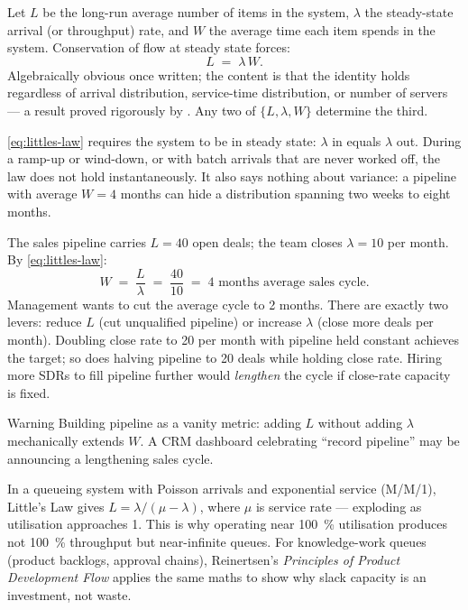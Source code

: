 Let \(L\) be the long-run average number of items in the system, \(\lambda\) the steady-state arrival (or throughput) rate, and \(W\) the average time each item spends in the system. Conservation of flow at steady state forces:
\begin{equation}\label{eq:littles-law}
  L \;=\; \lambda \, W.
\end{equation}
Algebraically obvious once written; the content is that the identity holds regardless of arrival distribution, service-time distribution, or number of servers --- a result proved rigorously by \textcite{cachon2024matching}. Any two of \(\{L, \lambda, W\}\) determine the third.

\cref{eq:littles-law} requires the system to be in steady state: \(\lambda\) in equals \(\lambda\) out. During a ramp-up or wind-down, or with batch arrivals that are never worked off, the law does not hold instantaneously. It also says nothing about variance: a pipeline with average \(W=4\) months can hide a distribution spanning two weeks to eight months.

\begin{example}
The sales pipeline carries \(L=40\) open deals; the team closes \(\lambda=10\) per month. By \cref{eq:littles-law}:
\[
  W \;=\; \frac{L}{\lambda} \;=\; \frac{40}{10} \;=\; 4\text{ months average sales cycle.}
\]
Management wants to cut the average cycle to 2 months. There are exactly two levers: reduce \(L\) (cut unqualified pipeline) or increase \(\lambda\) (close more deals per month). Doubling close rate to 20 per month with pipeline held constant achieves the target; so does halving pipeline to 20 deals while holding close rate. Hiring more SDRs to fill pipeline further would \emph{lengthen} the cycle if close-rate capacity is fixed.
\end{example}

\begin{admonition}{Warning}
Building pipeline as a vanity metric: adding \(L\) without adding \(\lambda\) mechanically extends \(W\). A CRM dashboard celebrating ``record pipeline'' may be announcing a lengthening sales cycle.
\end{admonition}

In a queueing system with Poisson arrivals and exponential service (M/M/1), Little's Law gives \(L = \lambda / (\mu - \lambda)\), where \(\mu\) is service rate --- exploding as utilisation approaches 1. This is why operating near \qty{100}{\percent} utilisation produces not \qty{100}{\percent} throughput but near-infinite queues. For knowledge-work queues (product backlogs, approval chains), Reinertsen's \emph{Principles of Product Development Flow} applies the same maths to show why slack capacity is an investment, not waste.

